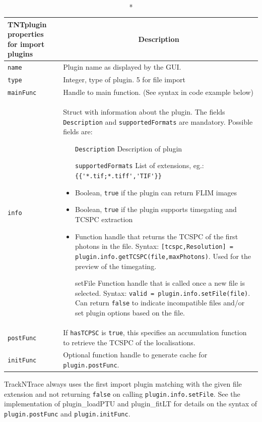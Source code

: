 \documentclass[11pt,onside]{report}
\numberwithin{equation}{chapter}
\begin{document}
\begin{longtable}[!h]{p{} p{}}
	\caption*{\textbf{TNTplugin properties for import plugins}}
	\endfirsthead
	\endhead
	\toprule
	\multicolumn{1}{c}{Property} & \multicolumn{1}{c}{Description}\\ \midrule
	\texttt{name} & Plugin name as displayed by the GUI. \\
	\texttt{type} & Integer, type of plugin. 5 for file import \\
	\texttt{mainFunc} & Handle to main function. (See syntax in code example below)\\
	\texttt{info} & Struct with information about the plugin. The fields \texttt{Description} and \texttt{supportedFormats} are mandatory. Possible fields are:
					\begin{itemize}[leftmargin=.2\textwidth,noitemsep,topsep=0pt]
						\item[\texttt{Description}] Description of plugin
						\item[\texttt{supportedFormats}] List of extensions, eg.: {\lstinline[style=Matlab-editor]|{{'*.tif;*.tiff','TIF'}}|}
						\item[\texttt{hasFLIM}] Boolean, {\lstinline[style=Matlab-editor]|true|} if the plugin can return FLIM images
						\item[\texttt{hasTCSPC}] Boolean, {\lstinline[style=Matlab-editor]|true|} if the plugin supports timegating and TCSPC extraction
						\item[\texttt{getTCSPC}] Function handle that returns the TCSPC of the first photons in the file. Syntax: 
						{\lstinline[style=Matlab-editor]|[tcspc,Resolution] = plugin.info.getTCSPC(file,maxPhotons)|}. Used for the preview of the timegating.
						\item[setFile] Function handle that is called once a new file is selected. Syntax: 
						{\lstinline[style=Matlab-editor]|valid = plugin.info.setFile(file)|}. Can return {\lstinline[style=Matlab-editor]|false|} to indicate incompatible files and/or set plugin options based on the file.
					\end{itemize}\nointerlineskip\\
	\texttt{postFunc} &  If \texttt{hasTCPSC} is \texttt{true}, this specifies an accumulation function to retrieve the TCSPC of the localisations.\\
	\texttt{initFunc} &  Optional function handle to generate cache for \texttt{plugin.postFunc}. \\
	\bottomrule
\end{longtable}
TrackNTrace always uses the first import plugin matching with the given file extension and not returning \texttt{false} on calling \texttt{plugin.info.setFile}.
See the implementation of \textsf{plugin\_loadPTU} and \textsf{plugin\_fitLT} for details on the syntax of \texttt{plugin.postFunc} and \texttt{plugin.initFunc}.
\end{document}
